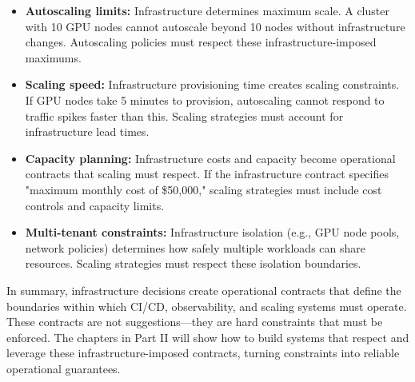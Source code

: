 \begin{itemize}
    \item \textbf{Autoscaling limits:} Infrastructure determines maximum scale. A cluster with 10 GPU nodes cannot autoscale beyond 10 nodes without infrastructure changes. Autoscaling policies must respect these infrastructure-imposed maximums.
    
    \item \textbf{Scaling speed:} Infrastructure provisioning time creates scaling constraints. If GPU nodes take 5 minutes to provision, autoscaling cannot respond to traffic spikes faster than this. Scaling strategies must account for infrastructure lead times.
    
    \item \textbf{Capacity planning:} Infrastructure costs and capacity become operational contracts that scaling must respect. If the infrastructure contract specifies "maximum monthly cost of \$50,000," scaling strategies must include cost controls and capacity limits.
    
    \item \textbf{Multi-tenant constraints:} Infrastructure isolation (e.g., GPU node pools, network policies) determines how safely multiple workloads can share resources. Scaling strategies must respect these isolation boundaries.
\end{itemize}

In summary, infrastructure decisions create operational contracts that define the boundaries within which CI/CD, observability, and scaling systems must operate. These contracts are not suggestions—they are hard constraints that must be enforced. The chapters in Part II will show how to build systems that respect and leverage these infrastructure-imposed contracts, turning constraints into reliable operational guarantees.

\printbibliography[
  heading=subbibliography,
  segment=\therefsegment,
  resetnumbers=true
]
